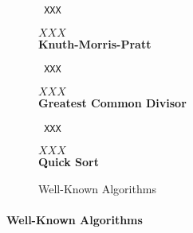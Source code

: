 \documentclass[nocopyrightspace,preprint]{sigplanconf}
\begin{document}
\begin{figure*}[t!]
 \setlength{\progwidth}{.24\linewidth}
  \centering
%
%
  \begin{minipage}[b]{\progwidth}
    \begin{center}
   \begin{lstlisting}
 XXX
   \end{lstlisting}

$XXX$
\\[.7\baselineskip]
      {\bf Knuth-Morris-Pratt}
    \end{center}
  \end{minipage}
%
%
  \begin{minipage}[b]{\progwidth}
    \begin{center}
   \begin{lstlisting}
 XXX
   \end{lstlisting}

$XXX$
\\[.7\baselineskip]
      {\bf Greatest Common Divisor}
    \end{center}
  \end{minipage}
%
%
  \begin{minipage}[b]{\progwidth}
    \begin{center}
   \begin{lstlisting}
 XXX
   \end{lstlisting}

$XXX$
\\[.7\baselineskip]
      {\bf Quick Sort}
    \end{center}
  \end{minipage}

   \caption{Well-Known Algorithms}
  \label{fig:cat3}
\end{figure*}

\paragraph{Well-Known Algorithms}








\end{document}
